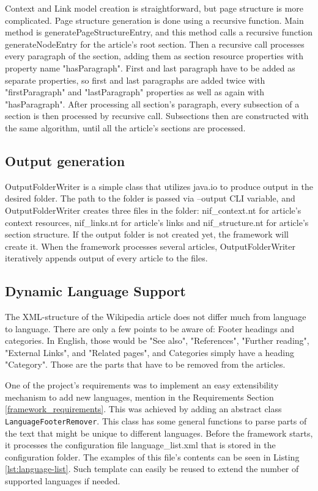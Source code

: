 \documentclass[thesis=M,english,hidelinks]{FITthesis}[2019/12/23]
\begin{document}
Context and Link model creation is straightforward, but page structure is more complicated. Page structure generation is done using a  recursive function. Main method is generatePageStructureEntry, and this method calls a recursive function generateNodeEntry for the article's root section. Then a recursive call processes every paragraph of the section, adding them as section resource properties with property name "hasParagraph". First and last paragraph have to be added as separate properties, so first and last paragraphs are added twice with "firstParagraph" and "lastParagraph" properties as well as again with "hasParagraph".  After processing all section's paragraph, every subsection of a section is then processed by recursive call. Subsections then are constructed with the same algorithm, until all the article's sections are processed.


\subsection{Output generation}

OutputFolderWriter is a simple class that utilizes java.io to produce output in the desired folder. The path to the folder is passed via --output CLI variable, and OutputFolderWriter creates three files in the folder: nif\_context.nt for article's context resources, nif\_links.nt for article's links and nif\_structure.nt for article's section structure. If the output folder is not created yet, the framework will create it. When the framework processes several articles, OutputFolderWriter iteratively appends output of every article to the files.

\subsection{Dynamic Language Support}\label{dynamic_lang_support}

The XML-structure of the Wikipedia article does not differ much from language to language. There are only a few points to be aware of: Footer headings and categories. In English, those would be "See also", "References", "Further reading", "External Links", and "Related pages", and Categories simply have a heading "Category". Those are the parts that have to be removed from the articles.

One of the project's requirements was to implement an easy extensibility mechanism to add new languages, mention in the Requirements Section \ref{framework_requirements}. This was achieved by adding an abstract class \lstinline{LanguageFooterRemover}. This class has some general functions to parse parts of the text that might be unique to different languages. Before the framework starts, it processes the configuration file language\_list.xml that is stored in the configuration folder. The examples of this file's contents can be seen in Listing \ref{lst:language-list}. Such template can easily be reused to extend the number of supported languages if needed.
\end{document}
